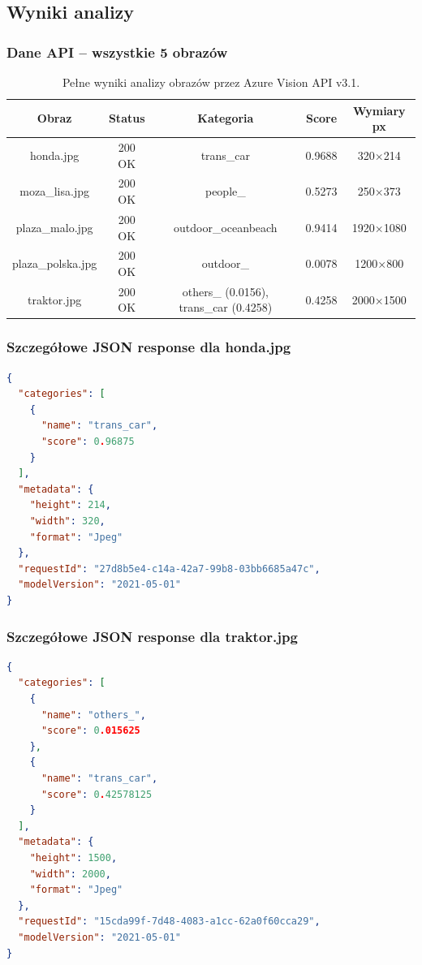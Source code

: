\subsection{Wyniki analizy}

\subsubsection{Dane API – wszystkie 5 obrazów}

\begin{table}[H]
	\centering
	\small
	\begin{tabular}{|c|c|c|c|c|}
		\hline
		\textbf{Obraz} & \textbf{Status} & \textbf{Kategoria} & \textbf{Score} & \textbf{Wymiary px} \\
		\hline
		honda.jpg & 200 OK & trans\_car & 0.9688 & 320×214 \\
		\hline
		moza\_lisa.jpg & 200 OK & people\_ & 0.5273 & 250×373 \\
		\hline
		plaza\_malo.jpg & 200 OK & outdoor\_oceanbeach & 0.9414 & 1920×1080 \\
		\hline
		plaza\_polska.jpg & 200 OK & outdoor\_ & 0.0078 & 1200×800 \\
		\hline
		traktor.jpg & 200 OK & others\_ (0.0156), trans\_car (0.4258) & 0.4258 & 2000×1500 \\
		\hline
	\end{tabular}
	\caption{Pełne wyniki analizy obrazów przez Azure Vision API v3.1.}
\end{table}

\subsubsection{Szczegółowe JSON response dla honda.jpg}

\begin{lstlisting}[language=json, caption=Rzeczywista odpowiedź API dla honda.jpg]
{
  "categories": [
    {
      "name": "trans_car",
      "score": 0.96875
    }
  ],
  "metadata": {
    "height": 214,
    "width": 320,
    "format": "Jpeg"
  },
  "requestId": "27d8b5e4-c14a-42a7-99b8-03bb6685a47c",
  "modelVersion": "2021-05-01"
}
\end{lstlisting}

\subsubsection{Szczegółowe JSON response dla traktor.jpg}

\begin{lstlisting}[language=json, caption=Rzeczywista odpowiedź API dla traktor.jpg (2 kategorie)]
{
  "categories": [
    {
      "name": "others_",
      "score": 0.015625
    },
    {
      "name": "trans_car",
      "score": 0.42578125
    }
  ],
  "metadata": {
    "height": 1500,
    "width": 2000,
    "format": "Jpeg"
  },
  "requestId": "15cda99f-7d48-4083-a1cc-62a0f60cca29",
  "modelVersion": "2021-05-01"
}
\end{lstlisting}

